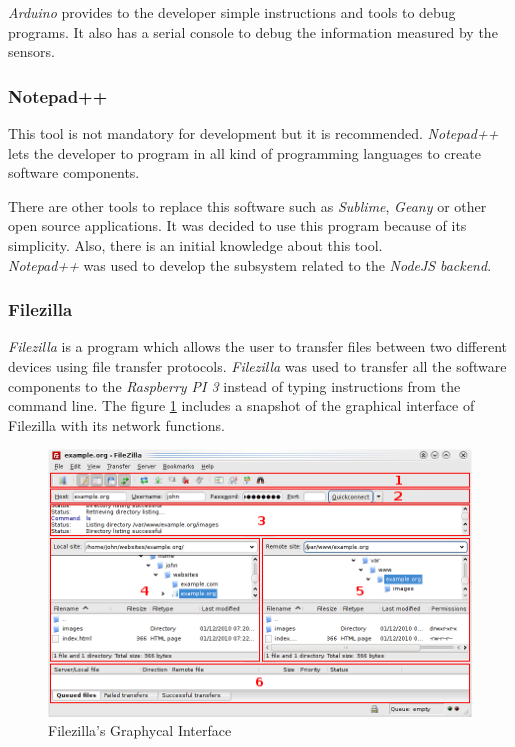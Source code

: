 \textit{Arduino} provides to the developer simple instructions and tools to debug programs. It also has a serial console to debug the information measured by the sensors.

\subsubsection{Notepad++}

This tool is not mandatory for development but it is recommended. \textit{Notepad++} lets the developer to program in all kind of programming languages to create software components.

There are other tools to replace this software such as \textit{Sublime}, \textit{Geany} or other open source applications. It was decided to use this program because of its simplicity. Also, there is an initial knowledge about this tool.\\

\textit{Notepad++} was used to develop the subsystem related to the \textit{NodeJS} \textit{backend}.

\subsubsection{Filezilla}

\textit{Filezilla} is a program which allows the user to transfer files between two different devices using file transfer protocols. \textit{Filezilla} was used to transfer all the software components to the \textit{Raspberry PI 3} instead of typing instructions from the command line. The figure \ref{FILEZILLA} includes a snapshot of the graphical interface of Filezilla with its network functions.\\

\begin{figure}[H]
\begin{centering}
\includegraphics[scale=0.9]{IMGS/FILEZILLA.png}
\caption{Filezilla's Graphycal Interface \label{FILEZILLA}}
\end{centering}
\end{figure}

